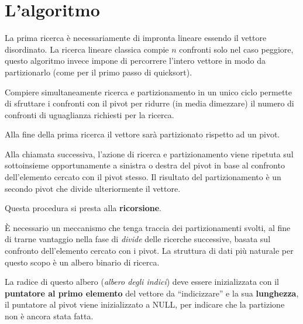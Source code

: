 \documentclass{article}
\begin{document}
\section{L'algoritmo}

    La prima ricerca è necessariamente di impronta lineare essendo il vettore
    disordinato.
    La ricerca lineare classica compie $n$ confronti solo nel caso
    peggiore, questo algoritmo invece impone di percorrere l'intero vettore in
    modo da partizionarlo (come per il primo passo di quicksort).

    Compiere simultaneamente ricerca e partizionamento in un unico ciclo
    permette di sfruttare i confronti con il pivot per ridurre (in media
    dimezzare) il numero di confronti di uguaglianza richiesti per la ricerca.

    Alla fine della prima ricerca il vettore sarà partizionato rispetto ad un
    pivot.

    Alla chiamata successiva, l'azione di ricerca e partizionamento viene
    ripetuta sul sottoinsieme opportunamente a sinistra o destra del pivot in
    base al confronto dell'elemento cercato con il pivot stesso. Il risultato
    del partizionamento è un secondo pivot che divide ulteriormente il vettore.

    Questa procedura si presta alla \textbf{ricorsione}.

    È necessario un meccanismo che tenga traccia dei partizionamenti svolti, al
    fine di trarne vantaggio nella fase di \textit{divide} delle ricerche
    successive, basata sul confronto dell'elemento cercato con i pivot. La
    struttura di dati più naturale per questo scopo è un albero binario di
    ricerca.

    La radice di questo albero (\textit{albero degli indici}) deve essere
    inizializzata con il \textbf{puntatore al primo elemento} del vettore da
    “indicizzare” e la sua \textbf{lunghezza}, il puntatore al pivot viene
    inizializzato a NULL, per indicare che la partizione non è ancora stata
    fatta.
\end{document}

